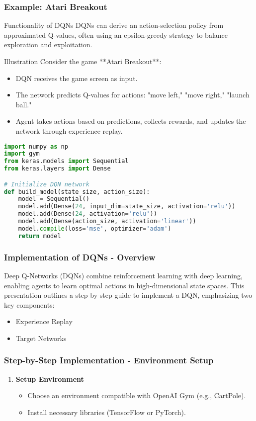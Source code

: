 \documentclass[aspectratio=169]{beamer}
\begin{document}
\begin{frame}[fragile]
    \frametitle{Example: Atari Breakout}
    \begin{block}{Functionality of DQNs}
        DQNs can derive an action-selection policy from approximated Q-values, often using an epsilon-greedy strategy to balance exploration and exploitation.
    \end{block}
    \begin{block}{Illustration}
        Consider the game **Atari Breakout**:
        \begin{itemize}
            \item DQN receives the game screen as input.
            \item The network predicts Q-values for actions: "move left," "move right," "launch ball."
            \item Agent takes actions based on predictions, collects rewards, and updates the network through experience replay.
        \end{itemize}
    \end{block}
    \begin{lstlisting}[language=Python, basicstyle=\footnotesize]
import numpy as np
import gym
from keras.models import Sequential
from keras.layers import Dense

# Initialize DQN network
def build_model(state_size, action_size):
    model = Sequential()
    model.add(Dense(24, input_dim=state_size, activation='relu'))
    model.add(Dense(24, activation='relu'))
    model.add(Dense(action_size, activation='linear'))
    model.compile(loss='mse', optimizer='adam')
    return model
    \end{lstlisting}
\end{frame}

\begin{frame}[fragile]
    \frametitle{Implementation of DQNs - Overview}
    Deep Q-Networks (DQNs) combine reinforcement learning with deep learning, enabling agents to learn optimal actions in high-dimensional state spaces. 
    This presentation outlines a step-by-step guide to implement a DQN, emphasizing two key components:
    \begin{itemize}
        \item Experience Replay
        \item Target Networks
    \end{itemize}
\end{frame}

\begin{frame}[fragile]
    \frametitle{Step-by-Step Implementation - Environment Setup}
    \begin{enumerate}
        \item \textbf{Setup Environment}
        \begin{itemize}
            \item Choose an environment compatible with OpenAI Gym (e.g., CartPole).
            \item Install necessary libraries (TensorFlow or PyTorch).
        \end{itemize}
    \end{enumerate}
\end{frame}
\end{document}
